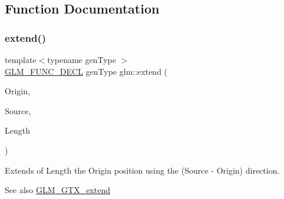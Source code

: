 \subsection{Function Documentation}
\mbox{\label{group__gtx__extend_ga8140caae613b0f847ab0d7175dc03a37}} 
\subsubsection{\texorpdfstring{extend()}{extend()}}
{\footnotesize\ttfamily template$<$typename gen\+Type $>$ \\
\hyperlink{setup_8hpp_ab2d052de21a70539923e9bcbf6e83a51}{G\+L\+M\+\_\+\+F\+U\+N\+C\+\_\+\+D\+E\+CL} gen\+Type glm\+::extend (\begin{DoxyParamCaption}\item[{gen\+Type const \&}]{Origin,  }\item[{gen\+Type const \&}]{Source,  }\item[{typename gen\+Type\+::value\+\_\+type const}]{Length }\end{DoxyParamCaption})}

Extends of Length the Origin position using the (Source -\/ Origin) direction. \begin{DoxySeeAlso}{See also}
\hyperlink{group__gtx__extend}{G\+L\+M\+\_\+\+G\+T\+X\+\_\+extend} 
\end{DoxySeeAlso}
